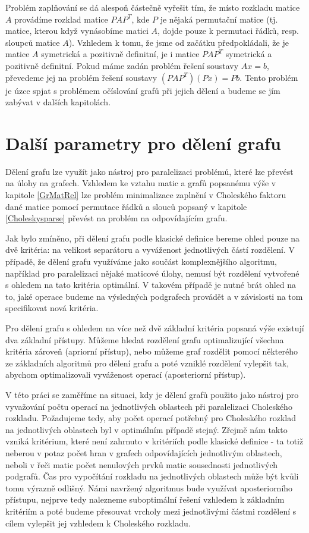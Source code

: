 \documentclass[11pt,american,czech,oneside]{book}
\theoremstyle{plain}
\theoremstyle{definition}
\begin{document}
Problém zaplňování se dá alespoň částečně vyřešit tím, že místo rozkladu matice $A$ provádíme rozklad matice $PAP^T$, kde $P$ je nějaká permutační matice (tj. matice, kterou když vynásobíme matici $A$, dojde pouze k permutaci řádků, resp. sloupců matice $A$). Vzhledem k tomu, že jsme od začátku předpokládali, že je matice $A$ symetrická a pozitivně definitní, je i matice $PAP^T$ symetrická a pozitivně definitní. Pokud máme zadán problém řešení soustavy $Ax=b$, převedeme jej na problém řešení soustavy $(PAP^T)(Px)=Pb$. Tento problém je úzce spjat s problémem očíslování grafů při jejich dělení a budeme se jím zabývat v dalších kapitolách.


\chapter{Další parametry pro dělení grafu}
\label{dalsiParametry}

Dělení grafu lze využít jako nástroj pro paralelizaci problémů, které lze převést na úlohy na grafech. Vzhledem ke vztahu matic a grafů popsanému výše v kapitole \ref{GrMatRel} lze problém minimalizace zaplnění v Choleského faktoru dané matice pomocí permutace řádků a slouců popsaný v kapitole \ref{Choleskysparse} převést na problém na odpovídajícím grafu.

Jak bylo zmíněno, při dělení grafu podle klasické definice bereme ohled pouze na dvě kritéria: na velikost separátoru a vyváženost jednotlivých částí rozdělení. V případě, že dělení grafu využíváme jako součást komplexnějšího algoritmu, například pro paralelizaci nějaké maticové úlohy, nemusí být rozdělení vytvořené s ohledem na tato kritéria optimální. V takovém případě je nutné brát ohled na to, jaké operace budeme na výsledných podgrafech provádět a v závislosti na tom specifikovat nová kritéria.

Pro dělení grafu s ohledem na více než dvě základní kritéria popsaná výše existují dva základní přístupy. Můžeme hledat rozdělení grafu optimalizující všechna kritéria zároveň (apriorní přístup), nebo můžeme graf rozdělit pomocí některého ze základních algoritmů pro dělení grafu a poté vzniklé rozdělení vylepšit tak, abychom optimalizovali vyváženost operací (aposteriorní přístup).

V této práci se zaměříme na situaci, kdy je dělení grafů použito jako nástroj pro vyvažování počtu operací na jednotlivých oblastech při paralelizaci Choleského rozkladu. Požadujeme tedy, aby počet operací potřebný pro Choleského rozklad na jednotlivých oblastech byl v optimálním případě stejný. Zřejmě nám takto vzniká kritérium, které není zahrnuto v kritériích podle klasické definice - ta totiž neberou v potaz počet hran v grafech odpovídajících jednotlivým oblastech, neboli v řeči matic počet nenulových prvků matic sousednosti jednotlivých podgrafů. Čas pro vypočítání rozkladu na jednotlivých oblastech může být kvůli tomu výrazně odlišný. Námi navržený algoritmus bude využívat aposteriorního přístupu, nejprve tedy nalezneme suboptimální řešení vzhledem k základním kritériím a poté budeme přesouvat vrcholy mezi jednotlivými částmi rozdělení s cílem vylepšit jej vzhledem k Choleského rozkladu.
\end{document}
